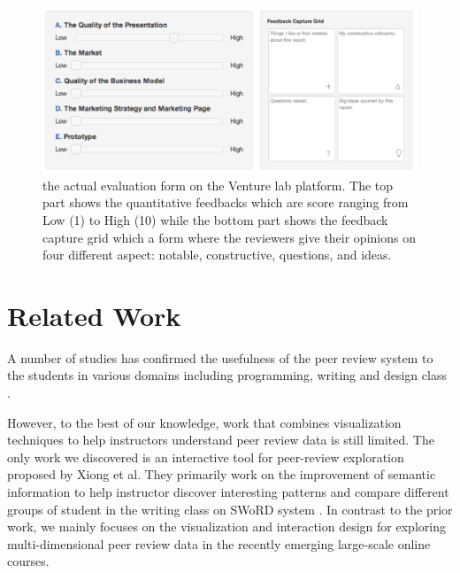 \documentclass{sigchi}
\begin{document}
\begin{figure}[!t]
\centering
\includegraphics[width=\columnwidth]{images/review-form}
\caption{the actual evaluation form on the Venture lab platform.
The top part shows the quantitative feedbacks which are score ranging
from Low (1) to High (10) while the bottom part shows the feedback capture grid
which a form where the reviewers give their opinions
on four different aspect: notable, constructive, questions, and ideas.}
\label{fig:review-form}
\end{figure}


\section{Related Work}

A number of studies has confirmed the usefulness of the peer review system
to the students in various domains including programming, writing and design class
\cite{MyPeerReview,WebBasedPeerReview,de2009assessment}.

However, to the best of our knowledge, work that combines visualization
techniques to help instructors understand peer review data is still limited.
The only work we discovered is  an interactive tool for peer-review
exploration proposed by Xiong et al. \cite{xiong} They primarily work on the
improvement of semantic information to help instructor discover interesting
patterns and compare different groups of student in the writing class on SWoRD
system \cite{Cho2007}. In contrast to the prior work, we mainly focuses on the
visualization and interaction design for exploring multi-dimensional peer
review data in the recently emerging large-scale online courses.
\end{document}
